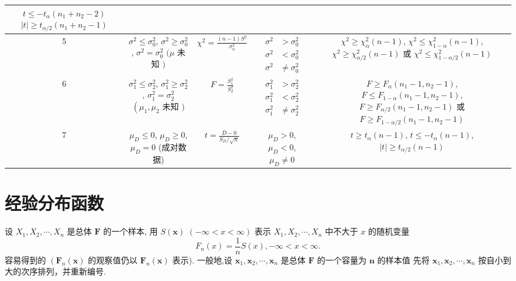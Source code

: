 \begin{table}[]
\begin{tabular}{c|c|c|c|c}
    $ t \leq-t_{\alpha}\left(n_{1}+n_{2}-2\right) $
    $ |t| \geq t_{\alpha / 2}\left(n_{1}+n_{2}-1\right) $ \\ \hline
    5 & $ \sigma^{2} \leq \sigma_{0}^{2} $,
    $ \sigma^{2} \geq \sigma_{0}^{2} $,
    $ \sigma^{2}=\sigma_{0}^{2} $
    $ (\mu $ 未知 $ ) $ & $ \chi^{2}=\frac{(n-1) S^{2}}{\sigma_{0}^{2}} $ & $ \begin{aligned} \sigma^{2} &>\sigma_{0}^{2} \\ \sigma^{2} &<\sigma_{0}^{2} \\ \sigma^{2} & \neq \sigma_{0}^{2} \end{aligned} $ & $ \chi^{2} \geq \chi_{\alpha}^{2}(n-1) $,
    $ \chi^{2} \leq \chi_{1-\alpha}^{2}(n-1) $,
    $ \chi^{2} \geq \chi_{\alpha / 2}^{2}(n-1) $ 或
    $ \chi^{2} \leq \chi_{1-\alpha / 2}^{2}(n-1) $ \\ \hline
    6 & $ \sigma_{1}^{2} \leq \sigma_{2}^{2} $,
    $ \sigma_{1}^{2} \geq \sigma_{2}^{2} $,
    $ \sigma_{1}^{2}=\sigma_{2}^{2} $
    $ \left(\mu_{1}, \mu_{2}\right. $ 未知 $ ) $ & $ F=\frac{S_{1}^{2}}{S_{2}^{2}} $ & $ \begin{aligned} \sigma_{1}^{2} &>\sigma_{2}^{2} \\ \sigma_{1}^{2} &<\sigma_{2}^{2} \\ \sigma_{1}^{2} & \neq \sigma_{2}^{2} \end{aligned} $ & $ F \geq F_{\alpha}\left(n_{1}-1, n_{2}-1\right) $,
    $ F \leq F_{1-\alpha}\left(n_{1}-1, n_{2}-1\right) $,
    $ F \geq F_{\alpha / 2}\left(n_{1}-1, n_{2}-1\right) $ 或
    $ F \geq F_{1-\alpha / 2}\left(n_{1}-1, n_{2}-1\right) $ \\ \hline
    7 & $ \mu_{D} \leq 0 $,
    $ \mu_{D} \geq 0 $,
    $ \mu_{D}=0 $
    (成对数据) & $ t=\frac{\bar{D}-0}{S_{D} / \sqrt{n}} $ & $ \mu_{D}>0 $,
    $ \mu_{D}<0 $,
    $ \mu_{D} \neq 0 $ &  $ t \geq t_{\alpha}(n-1) $,
    $ t \leq-t_{\alpha}(n-1) $,
    $ |t| \geq t_{\alpha / 2}(n-1) $
    \end{tabular}
\end{table}

\section{经验分布函数}

设 $ X_{1}, X_{2}, \cdots, X_{n} $ 是总体 $ \boldsymbol{F} $ 的一个样本, 用 $ S(\boldsymbol{x}) $
$ (-\infty<x<\infty) $ 表示 $ X_{1}, X_{2}, \cdots, X_{n} $ 中不大于 $ x $ 的随机变量
$$
F_{n}(x)=\frac{1}{n} S(x),-\infty<x<\infty .
$$
容易得到的 $ \left(\boldsymbol{F}_{n}(\boldsymbol{x})\right. $ 的观察值仍以 $ \boldsymbol{F}_{n}(\boldsymbol{x}) $ 表示). 
一般地,设 $ \boldsymbol{x}_{1}, \boldsymbol{x}_{2}, \cdots, \boldsymbol{x}_{n} $ 是总体 $ \boldsymbol{F} $ 的一个容量为 $ \boldsymbol{n} $ 的样本值
先将 $ \boldsymbol{x}_{1}, \boldsymbol{x}_{2}, \cdots, \boldsymbol{x}_{n} $ 按自小到大的次序排列，并重新编号. 

